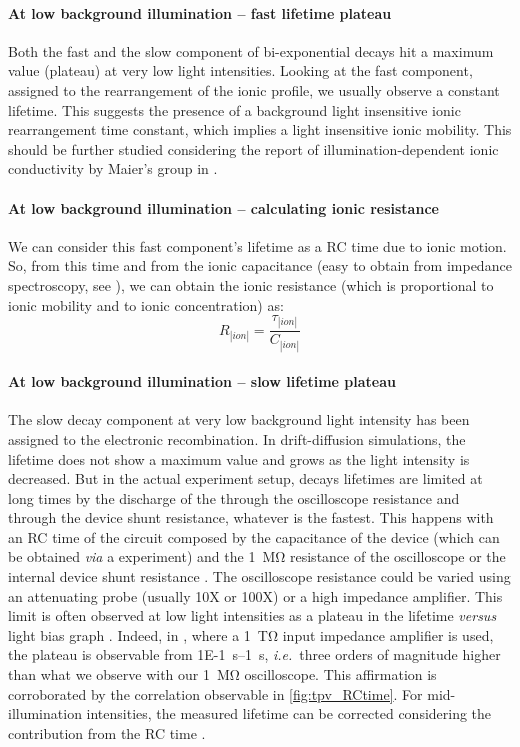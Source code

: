 		\paragraph{At low background illumination -- fast lifetime plateau}
		Both the fast and the slow component of bi\hyp{}exponential decays hit a maximum value (plateau) at very low light intensities.
		Looking at the fast component, assigned to the rearrangement of the ionic profile, we usually observe a constant lifetime.
		This suggests the presence of a background light insensitive ionic rearrangement time constant, which implies a light insensitive ionic mobility.
		This should be further studied considering the report of illumination-dependent ionic conductivity by Maier's group in .

		\paragraph{At low background illumination -- calculating ionic resistance}
		We can consider this fast component's lifetime as a RC time due to ionic motion.
		So, from this time and from the ionic capacitance (easy to obtain from impedance spectroscopy, see ), we can obtain the ionic resistance (which is proportional to ionic mobility and to ionic concentration) as:
		\begin{equation}
			R_|ion| = \frac{\tau_|ion|}{C_|ion|}
		\end{equation}

		\paragraph{At low background illumination -- slow lifetime plateau}
		The slow decay component at very low background light intensity has been assigned to the electronic recombination.
		In drift-diffusion simulations, the lifetime does not show a maximum value and grows as the light intensity is decreased.
		But in the actual experiment setup, decays lifetimes are limited at long times by the discharge of the through the oscilloscope resistance and through the device shunt resistance, whatever is the fastest.
		This happens with an RC time of the circuit composed by the capacitance of the device (which can be obtained \textsl{via} a  experiment) and the \SI{1}{\Mohm} resistance of the oscilloscope or the internal device shunt resistance \cite{Tvingstedt2017}.
		The oscilloscope resistance could be varied using an attenuating probe (usually 10X or 100X) or a high impedance amplifier.
		This limit is often observed at low light intensities as a plateau in the  lifetime \textsl{versus} light bias graph \cite{Tvingstedt2017}.
		Indeed, in , where a \SI{1}{\tera\ohm} input impedance amplifier is used, the plateau is observable from \SIrange{1E-1}{1}{\s}, \textsl{i.e.}\ three orders of magnitude higher than what we observe with our \SI{1}{\Mohm} oscilloscope.
		This affirmation is corroborated by the correlation observable in \cref{fig:tpv_RCtime}.
		For mid-illumination intensities, the measured lifetime can be corrected considering the contribution from the RC time \cite{Credgington2014}.

